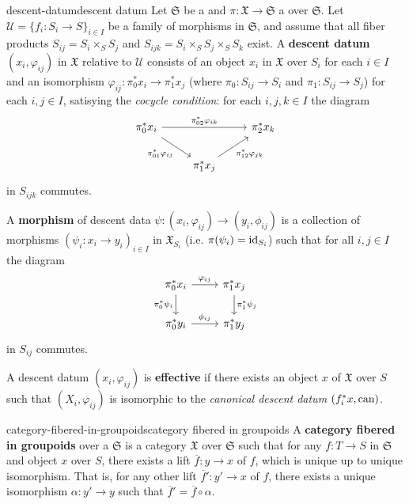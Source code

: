 \begin{topic}{descent-datum}{descent datum}
    Let $\mathfrak{S}$ be a  and $\pi \colon \mathfrak{X} \to \mathfrak{S}$ a  over $\mathfrak{S}$. Let $\mathcal{U} = \{ f_i \colon S_i \to S \}_{i \in I}$ be a family of morphisms in $\mathfrak{S}$, and assume that all fiber products $S_{ij} = S_i \times_S S_j$ and $S_{ijk} = S_i \times_S S_j \times_S S_k$ exist. A \textbf{descent datum} $(x_i, \varphi_{ij})$ in $\mathfrak{X}$ relative to $\mathcal{U}$ consists of an object $x_i$ in $\mathfrak{X}$ over $S_i$ for each $i \in I$ and an isomorphism $\varphi_{ij} \colon \pi_0^* x_i \to \pi_1^* x_j$ (where $\pi_0 \colon S_{ij} \to S_i$ and $\pi_1 \colon S_{ij} \to S_j$) for each $i, j \in I$, satisying the \textit{cocycle condition}: for each $i, j, k \in I$ the diagram
    \[ \svg \begin{tikzcd} \pi_0^* x_i \arrow{rr}{\pi_{02}^* \varphi_{ik}} \arrow[swap]{rd}{\pi_{01}^* \varphi_{ij}} && \pi_2^* x_k \\ & \pi_1^* x_j \arrow[swap]{ur}{\pi_{12}^* \varphi_{jk}} & \end{tikzcd} \]
    in $S_{ijk}$ commutes.
    
    A \textbf{morphism} of descent data $\psi \colon (x_i, \varphi_{ij}) \to (y_i, \phi_{ij})$ is a collection of morphisms $(\psi_i \colon x_i \to y_i)_{i \in I}$ in $\mathfrak{X}_{S_i}$ (i.e. $\pi(\psi_i) = \textup{id}_{S_i}$) such that for all $i, j \in I$ the diagram
    \[ \svg \begin{tikzcd} \pi_0^* x_i \arrow{r}{\varphi_{ij}} \arrow[swap]{d}{\pi_0^* \psi_i} & \pi_1^* x_j \arrow{d}{\pi_1^* \psi_j} \\ \pi_0^* y_i \arrow{r}{\phi_{ij}} & \pi_1^* y_j \end{tikzcd} \]
    in $S_{ij}$ commutes.
    
    A descent datum $(x_i, \varphi_{ij})$ is \textbf{effective} if there exists an object $x$ of $\mathfrak{X}$ over $S$ such that $(X_i, \varphi_{ij})$ is isomorphic to the \textit{canonical descent datum} $(f_i^* x, \textup{can})$.
\end{topic}

\begin{topic}{category-fibered-in-groupoids}{category fibered in groupoids}
    A \textbf{category fibered in groupoids} over a  $\mathfrak{S}$ is a category $\mathfrak{X}$ over $\mathfrak{S}$ such that for any $f \colon T \to S$ in $\mathfrak{S}$ and object $x$ over $S$, there exists a lift $\overline{f} \colon y \to x$ of $f$, which is unique up to unique isomorphism. That is, for any other lift $\overline{f}' \colon y' \to x$ of $f$, there exists a unique isomorphism $\alpha \colon y' \to y$ such that $\overline{f}' = \overline{f} \circ \alpha$.
\end{topic}

